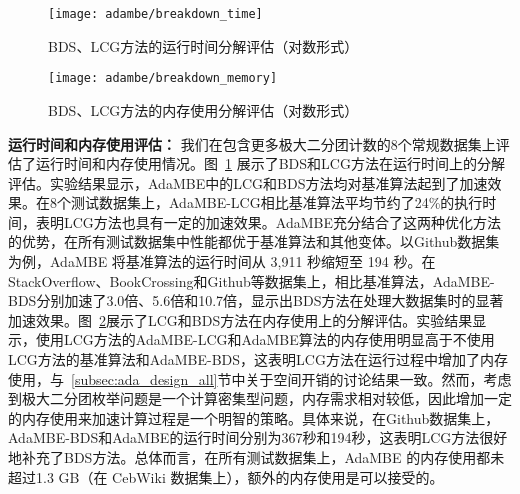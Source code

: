 



\begin{figure} [H]
	\centering
	\texttt{[image: adambe/breakdown\_time]}
	\caption{BDS、LCG方法的运行时间分解评估（对数形式）}

	\label{fig:ada_breakdown_time}
\end{figure}

\begin{figure} [H]
	\centering
	\texttt{[image: adambe/breakdown\_memory]}
	\caption{BDS、LCG方法的内存使用分解评估（对数形式）}

	\label{fig:ada_breakdown_memory}
\end{figure}


\textbf{运行时间和内存使用评估：} 我们在包含更多极大二分团计数的8个常规数据集上评估了运行时间和内存使用情况。图~\ref{fig:ada_breakdown_time} 展示了BDS和LCG方法在运行时间上的分解评估。实验结果显示，AdaMBE中的LCG和BDS方法均对基准算法起到了加速效果。在8个测试数据集上，AdaMBE-LCG相比基准算法平均节约了24\%的执行时间，表明LCG方法也具有一定的加速效果。AdaMBE充分结合了这两种优化方法的优势，在所有测试数据集中性能都优于基准算法和其他变体。以Github数据集为例，AdaMBE 将基准算法的运行时间从 3,911 秒缩短至 194 秒。在StackOverflow、BookCrossing和Github等数据集上，相比基准算法，AdaMBE-BDS分别加速了3.0倍、5.6倍和10.7倍，显示出BDS方法在处理大数据集时的显著加速效果。图~\ref{fig:ada_breakdown_memory}展示了LCG和BDS方法在内存使用上的分解评估。实验结果显示，使用LCG方法的AdaMBE-LCG和AdaMBE算法的内存使用明显高于不使用LCG方法的基准算法和AdaMBE-BDS，这表明LCG方法在运行过程中增加了内存使用，与~\ref{subsec:ada_design_all}节中关于空间开销的讨论结果一致。然而，考虑到极大二分团枚举问题是一个计算密集型问题，内存需求相对较低，因此增加一定的内存使用来加速计算过程是一个明智的策略。具体来说，在Github数据集上，AdaMBE-BDS和AdaMBE的运行时间分别为367秒和194秒，这表明LCG方法很好地补充了BDS方法。总体而言，在所有测试数据集上，AdaMBE 的内存使用都未超过1.3 GB（在 CebWiki 数据集上），额外的内存使用是可以接受的。



